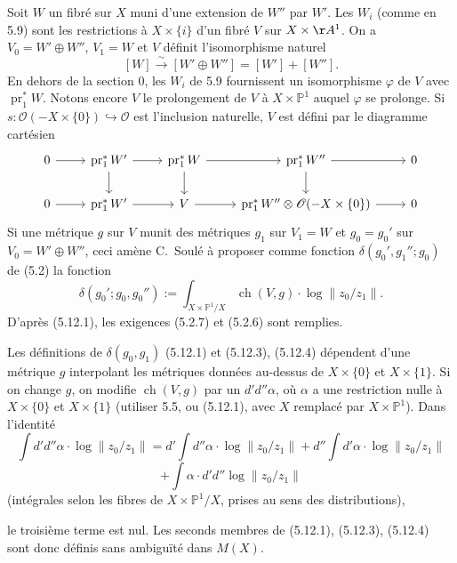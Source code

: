 \documentclass[12pt,a4paper]{article}
\theoremstyle{plain}
\theoremstyle{definition}
\DeclareMathOperator{\ch}{ch}
\DeclareMathOperator{\pr}{pr}
\newcommand{\PP}{\mathbb{P}}
\newcommand{\Oo}{\mathscr{O}}
\begin{document}
Soit $W$ un fibr\'e sur $X$ muni d'une extension de $W''$ par $W'$. Les $W_i$ (comme en
5.9) sont les restrictions \`a $X \times \{i\}$ d'un fibr\'e $V$ sur $X \times \AA^1$. On a $V_0 =
W' \oplus W''$, $V_1 = W$ et $V$ d\'efinit l'isomorphisme naturel
\[
[W] \xrightarrow{\sim} [W' \oplus W''] = [W'] + [W''] .
\]
En dehors de la section $0$, les $W_i$ de 5.9 fournissent un isomorphisme $\varphi$ de
$V$ avec $\pr_1^* W$. Notons encore $V$ le prolongement de $V$ \`a $X \times \PP^1$ auquel
$\varphi$ se prolonge. Si $s: \Oo(-X \times \{0\}) \hookrightarrow \Oo$ est l'inclusion naturelle, $V$ est d\'efini
par le diagramme cart\'esien
\[
\begin{tikzcd}
0 \arrow[r] & \pr_1^* W' \arrow[r] \arrow[d] & \pr_1^* W \arrow[r] \arrow[d] & \pr_1^* W'' \arrow[r] \arrow[d] & 0 \\
0 \arrow[r] & \pr_1^* W' \arrow[r] & V \arrow[r] & \pr_1^* W'' \otimes \Oo(-X \times \{0\}) \arrow[r] & 0
\end{tikzcd}
\]
Si une m\'etrique $g$ sur $V$ munit des m\'etriques $g_1$ sur $V_1 = W$ et $g_0 =
g_0'$ sur $V_0 = W' \oplus W''$, ceci am\`ene C.~Soul\'e \`a proposer comme fonction $\delta(g_0', g_1'';
g_0)$ de (5.2) la fonction
\begin{equation}\label{eq:5.12.4}
\delta(g_0'; g_0, g_0'') := \int_{X \times \PP^1/X} \ch(V, g) \cdot \log\|z_0/z_1\| .
\end{equation}
D'apr\`es (5.12.1), les exigences (5.2.7) et (5.2.6) sont remplies.

Les d\'efinitions de $\delta(g_0, g_1)$ (5.12.1) et (5.12.3), (5.12.4) d\'ependent d'une
m\'etrique $g$ interpolant les m\'etriques donn\'ees au-dessus de $X \times \{0\}$ et $X \times
\{1\}$. Si on change $g$, on modifie $\ch(V, g)$ par un $d'd'' \alpha$, o\`u $\alpha$ a une restriction
nulle \`a $X \times \{0\}$ et $X \times \{1\}$ (utiliser 5.5, ou (5.12.1), avec $X$ remplac\'e par
$X \times \PP^1$). Dans l'identit\'e
\[
\int d'd''\alpha \cdot \log\|z_0/z_1\| = d'\int d''\alpha \cdot \log\|z_0/z_1\| + d''\int d'\alpha \cdot \log\|z_0/z_1\|
\]
\[
+ \int \alpha \cdot d'd''\log\|z_0/z_1\|
\]
(int\'egrales selon les fibres de $X \times \PP^1/X$, prises au sens des distributions),

le troisi\`eme terme est nul. Les seconds membres de (5.12.1), (5.12.3), (5.12.4)
sont donc d\'efinis sans ambigu\"it\'e dans $M(X)$.



\newpage
\end{document}
